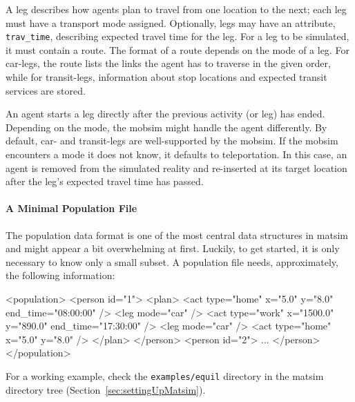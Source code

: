A \gls{leg} describes how agents plan to travel from one location to the next; each \gls{leg} must have a transport mode assigned. Optionally, legs may have an attribute, \lstinline|trav_time|, describing expected travel time for the leg. For a leg to be simulated, it must contain a route. The format of a route depends on the mode of a leg. For car-legs, the route lists the links the agent has to traverse in the given order, while for transit-legs, information about stop locations and expected transit services are stored.

An agent starts a leg directly after the previous activity (or leg) has ended. Depending on the mode, the \gls{mobsim} might handle the agent differently. By default, car- and transit-legs are well-supported by the \gls{mobsim}. If the \gls{mobsim} encounters a mode it does not know, it defaults to \gls{teleportation}. In this case, an agent is removed from the simulated reality and re-inserted at its target location after the leg's expected travel time has passed.

\paragraph{A Minimal Population File}

The population data format is one of the most central data structures in \gls{matsim} and might appear a bit overwhelming at first. Luckily, to get started, it is only necessary to know only a small subset.  A population file needs, approximately,  the following information:
\begin{xml}
<population> 
   <person id="1"> 
      <plan> 
         <act type="home" x="5.0" y="8.0" end_time="08:00:00" /> 
         <leg mode="car" /> 
         <act type="work" x="1500.0" y="890.0" end_time="17:30:00" /> 
         <leg mode="car" /> 
         <act type="home" x="5.0" y="8.0" /> 
      </plan> 
   </person> 
   <person id="2"> 
      ... 
   </person> 
</population>
\end{xml}
For a working example, check the \lstinline{examples/equil} directory in the \gls{matsim} directory tree (\cf Section~\ref{sec:settingUpMatsim}).

